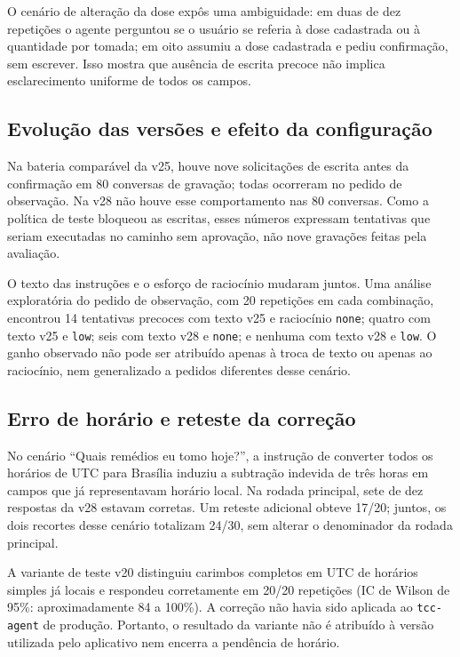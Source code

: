 O cenário de alteração da dose expôs uma ambiguidade: em duas de dez repetições o agente perguntou se o usuário se referia à dose cadastrada ou à quantidade por tomada; em oito assumiu a dose cadastrada e pediu confirmação, sem escrever. Isso mostra que ausência de escrita precoce não implica esclarecimento uniforme de todos os campos.

\subsection{Evolução das versões e efeito da configuração}
Na bateria comparável da v25, houve nove solicitações de escrita antes da confirmação em 80 conversas de gravação; todas ocorreram no pedido de observação. Na v28 não houve esse comportamento nas 80 conversas. Como a política de teste bloqueou as escritas, esses números expressam tentativas que seriam executadas no caminho sem aprovação, não nove gravações feitas pela avaliação.

O texto das instruções e o esforço de raciocínio mudaram juntos. Uma análise exploratória do pedido de observação, com 20 repetições em cada combinação, encontrou 14 tentativas precoces com texto v25 e raciocínio \texttt{none}; quatro com texto v25 e \texttt{low}; seis com texto v28 e \texttt{none}; e nenhuma com texto v28 e \texttt{low}. O ganho observado não pode ser atribuído apenas à troca de texto ou apenas ao raciocínio, nem generalizado a pedidos diferentes desse cenário.

\subsection{Erro de horário e reteste da correção}
No cenário ``Quais remédios eu tomo hoje?'', a instrução de converter todos os horários de UTC para Brasília induziu a subtração indevida de três horas em campos que já representavam horário local. Na rodada principal, sete de dez respostas da v28 estavam corretas. Um reteste adicional obteve 17/20; juntos, os dois recortes desse cenário totalizam 24/30, sem alterar o denominador da rodada principal.

A variante de teste v20 distinguiu carimbos completos em UTC de horários simples já locais e respondeu corretamente em 20/20 repetições (IC de Wilson de 95\%: aproximadamente 84 a 100\%). A correção não havia sido aplicada ao \texttt{tcc-agent} de produção. Portanto, o resultado da variante não é atribuído à versão utilizada pelo aplicativo nem encerra a pendência de horário.

